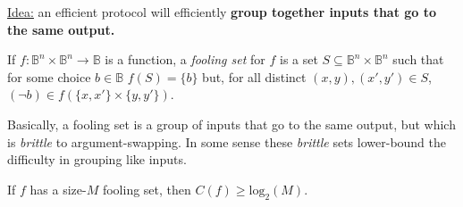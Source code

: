 \underline{Idea:} an efficient protocol will efficiently \textbf{group together inputs that go to the same output.}

\begin{definition}
If $f : \mathbb{B}^n \times \mathbb{B}^n \to \mathbb{B}$ is a function,
	a \emph{fooling set} for $f$ is a set
	\(S \subseteq \mathbb{B}^n \times \mathbb{B}^n\)
	such that for some choice $b \in \mathbb{B}$
\(f(S) = \{ b \}\)
but, for all distinct $(x, y), (x', y') \in S$,
\((\neg b) \in f(\{ x, x' \} \times \{ y, y' \})\).
\end{definition}
Basically, a fooling set is a group of inputs that go to the same output,
but which is \emph{brittle} to argument-swapping.
In some sense these \emph{brittle} sets lower-bound the difficulty in grouping like inputs.
\pause
\begin{lemma}
If $f$ has a size-$M$ fooling set, then $C(f) \geq \text{log}_2(M)$.
\end{lemma}